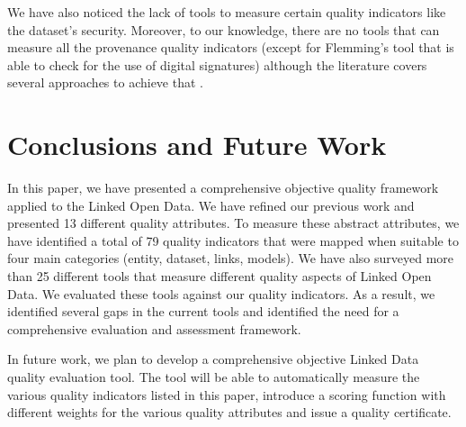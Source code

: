 \documentclass[onecolumn, crcready]{iosart2c}
\begin{document}
We have also noticed the lack of tools to measure certain quality indicators like the dataset's security. Moreover, to our knowledge, there are no tools that can measure all the provenance quality indicators (except for Flemming's tool that is able to check for the use of digital signatures) although the literature covers several approaches to achieve that \cite{Hartig09usingweb}\cite{Flouris2012}\cite{Harth2009}. \\

\section{Conclusions and Future Work}

In this paper, we have presented a comprehensive objective quality framework applied to the Linked Open Data. We have refined our previous work and presented 13 different quality attributes. To measure these abstract attributes, we have identified a total of 79 quality indicators that were mapped when suitable to four main categories (entity, dataset, links, models).
We have also surveyed more than 25 different tools that measure different quality aspects of Linked Open Data. We evaluated these tools against our quality indicators. As a result, we identified several gaps in the current tools and identified the need for a comprehensive evaluation and assessment framework.

In future work, we plan to develop a comprehensive objective Linked Data quality evaluation tool. The tool will be able to automatically measure the various quality indicators listed in this paper, introduce a scoring function with different weights for the various quality attributes and issue a quality certificate.



\end{document}

